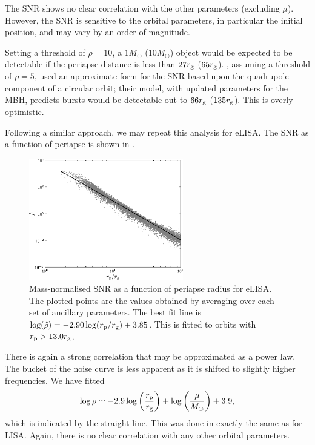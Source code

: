 The SNR shows no clear correlation with the other parameters (excluding $\mu$). However, the SNR is sensitive to the orbital parameters, in particular the initial position, and may vary by an order of magnitude.

Setting a threshold of $\rho = 10$, a $1 M_\odot$ ($10 M_\odot$) object would be expected to be detectable if the periapse distance is less than $27 r_\mathrm{g}$ ($65 r_\mathrm{g}$). \citet{Hopman2007}, assuming a threshold of $\rho = 5$, used an approximate form for the SNR based upon the quadrupole component of a circular orbit; their model, with updated parameters for the MBH, predicts bursts would be detectable out to $66 r_\mathrm{g}$ ($135 r_\mathrm{g}$). This is overly optimistic.

Following a similar approach, we may repeat this analysis for eLISA. The SNR as a function of periapse is shown in .
\begin{figure}%
  \begin{center}
  \includegraphics[width=0.6\textwidth]{./images/Fig_SNR_eLISA_NGO}
    \caption{Mass-normalised SNR as a function of periapse radius for eLISA. The plotted points are the values obtained by averaging over each set of ancillary parameters. The best fit line is $\log(\hat{\rho}) = -2.90\log(r_\mathrm{p}/r_\mathrm{g}) + 3.85$. This is fitted to orbits with $r_\mathrm{p} >  13.0 r_\mathrm{g}$.\label{fig:SNR-eLISA}}
    \end{center}
\end{figure}
There is again a strong correlation that may be approximated as a power law. The bucket of the noise curve is less apparent as it is shifted to slightly higher frequencies. We have fitted
\begin{equation}
\log\rho \simeq -2.9\log\left(\frac{r_\mathrm{p}}{r_\mathrm{g}}\right) + \log\left(\frac{\mu}{M_\odot}\right) + 3.9,
\label{eq:SNR-power-law-eLISA}
\end{equation}
which is indicated by the straight line. This was done in exactly the same as for LISA. Again, there is no clear correlation with any other orbital parameters.

